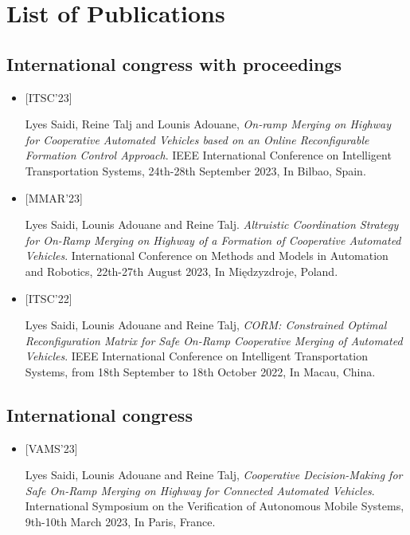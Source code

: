 \chapter{List of Publications}




\section*{International congress with proceedings}
\begin{itemize}
\item \hypertarget{ITSC23}{[ITSC’23]} Lyes Saidi, Reine Talj and Lounis Adouane, \textit{On-ramp Merging on Highway for Cooperative Automated Vehicles based on an Online Reconfigurable Formation Control Approach}. IEEE International Conference on Intelligent Transportation Systems, 24th-28th September 2023, In Bilbao, Spain. 



\item \hypertarget{MMAR23}{[MMAR'23]} Lyes Saidi, Lounis Adouane and Reine Talj. \textit{Altruistic Coordination Strategy for On-Ramp Merging on Highway of a Formation of Cooperative Automated Vehicles}. International Conference on Methods and Models in Automation and Robotics, 22th-27th August 2023, In Międzyzdroje, Poland. 


\item \hypertarget{ITSC22}{[ITSC’22]} Lyes Saidi, Lounis Adouane and Reine Talj, \textit{CORM: Constrained Optimal Reconfiguration Matrix for Safe On-Ramp Cooperative Merging of Automated Vehicles}. IEEE International Conference on Intelligent Transportation Systems, from 18th September to 18th October 2022, In Macau, China. 
\end{itemize}







\section*{International congress}
\begin{itemize}
    \item \hypertarget{VAMS23}{[VAMS’23]} Lyes Saidi, Lounis Adouane and Reine Talj, \textit{Cooperative Decision-Making for Safe On-Ramp Merging on Highway for Connected Automated Vehicles}. International Symposium on the Verification of Autonomous Mobile Systems, 9th-10th March 2023, In Paris, France.
\end{itemize}




